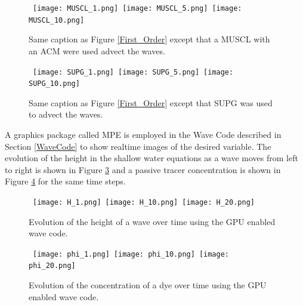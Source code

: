 \begin{figure}[htbp]
\begin{center}
\mbox{
\texttt{[image: MUSCL\_1.png]}
\texttt{[image: MUSCL\_5.png]}
\texttt{[image: MUSCL\_10.png]}
} 
\mbox{  
}
\caption{Same caption as Figure \ref{First_Order} except that a MUSCL with an ACM were used advect the waves.}
\label{fig:MUSCL}
\end{center}
\end{figure}

\begin{figure}[htbp]
\begin{center}
\mbox{
\texttt{[image: SUPG\_1.png]}
\texttt{[image: SUPG\_5.png]}
\texttt{[image: SUPG\_10.png]}
} 
\mbox{  
}
\caption{Same caption as Figure \ref{First_Order} except that SUPG was used to advect the waves.}
\label{fig:SUPG}
\end{center}
\end{figure}

A graphics package called MPE is employed in the Wave Code described in Section \ref{WaveCode} to show realtime images of the desired variable. The evolution of the height in the shallow water equations as a wave moves from left to right is shown in Figure \ref{fig:H} and a passive tracer concentration is shown in Figure \ref{fig:phi} for the same time steps.

\begin{figure}[htbp]
\begin{center}
\mbox{
\texttt{[image: H\_1.png]}
\texttt{[image: H\_10.png]}
\texttt{[image: H\_20.png]}
} 
\caption{Evolution of the height of a wave over time using the GPU enabled wave code.}
\label{fig:H}
\end{center}
\end{figure}

\begin{figure}[htbp]
\begin{center}
\mbox{
\texttt{[image: phi\_1.png]}
\texttt{[image: phi\_10.png]}
\texttt{[image: phi\_20.png]}
} 
\caption{Evolution of the concentration of a dye over time using the GPU enabled wave code.}
\label{fig:phi}
\end{center}
\end{figure}
